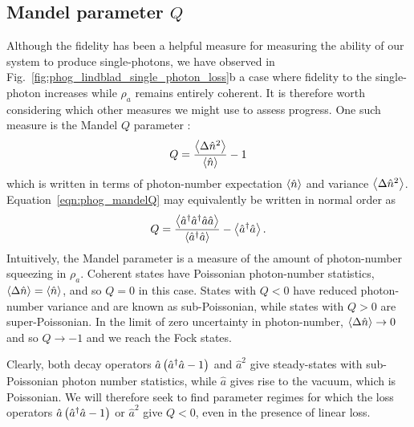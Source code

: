\subsection{Mandel parameter $Q$}
Although the fidelity has been a helpful measure for measuring the ability of our system to produce single-photons, we have observed in Fig.~\ref{fig:phog_lindblad_single_photon_loss}b a case where fidelity to the single-photon increases while $\rho_a$ remains entirely coherent. It is therefore worth considering which other measures we might use to assess progress. One such measure is the Mandel $Q$ parameter \cite{Mandel1979, Carmichael1999, Davidovich1996}:
\begin{equation}\label{eqn:phog_mandelQ}
Q = \frac{\ev{\Delta\hat{n}^2}}{\ev{\hat{n}}} - 1
\end{equation}
which is written in terms of photon-number expectation $\ev{\hat{n}}$ and variance $\ev{\Delta\hat{n}^2}$. Equation~\ref{eqn:phog_mandelQ} may equivalently be written in normal order as 
\begin{equation}
Q = \frac{\ev{\hat{a}^\dagger \hat{a}^\dagger \hat{a}\hat{a}}}{\ev{\hat{a}^\dagger \hat{a}}} - \ev{\hat{a}^\dagger \hat{a}}.
\end{equation}
Intuitively, the Mandel parameter is a measure of the amount of photon-number squeezing in $\rho_a$. Coherent states have Poissonian photon-number statistics, $\ev{\Delta\hat{n}} = \ev{\hat{n}}$, and so $Q = 0$ in this case. States with $Q < 0$ have reduced photon-number variance and are known as sub-Poissonian, while states with $Q > 0$ are super-Poissonian. In the limit of zero uncertainty in photon-number, $\ev{\Delta\hat{n}} \rightarrow 0$ and so $Q \rightarrow -1$ and we reach the Fock states.

Clearly, both decay operators $\hat{a}\left(\hat{a}^\dagger \hat{a} - 1\right)$ and $\hat{a}^2$ give steady-states with sub-Poissonian photon number statistics, while $\hat{a}$ gives rise to the vacuum, which is Poissonian. We will therefore seek to find parameter regimes for which the loss operators $\hat{a}\left(\hat{a}^\dagger \hat{a} - 1\right)$ or $\hat{a}^2$ give $Q<0$, even in the presence of linear loss.


